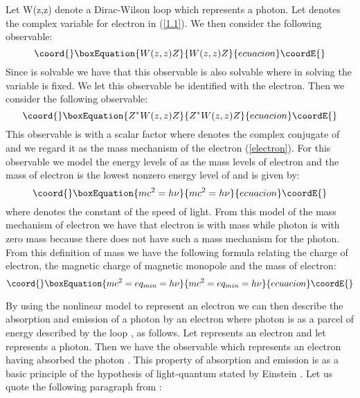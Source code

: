 \documentclass[a4paper,a4paper]{article}
\begin{document}
Let W(z,z) denote a Dirac-Wilson loop which represents a photon. Let
\coordHE{} denotes the complex variable for electron in (\ref{1.1}). We then consider the following observable:
\begin{equation}\coord{}\boxEquation{
 W(z,z)Z
\label{electron}
}{
 W(z,z)Z
}{ecuacion}\coordE{}\end{equation}
Since \coordHE{} is solvable we have that this observable is also solvable where in solving \coordHE{} the variable \coordHE{} is fixed. We let this observable be identified with the electron. Then we consider the following observable:
\begin{equation}\coord{}\boxEquation{
 Z^* W(z,z)Z
\label{electron1}
}{
 Z^* W(z,z)Z
}{ecuacion}\coordE{}\end{equation}
This observable is with a scalar factor \coordHE{} where \coordHE{} denotes the complex conjugate of \coordHE{} and we regard it as the mass mechanism of the electron (\ref{electron}). For this observable we model the energy levels of \coordHE{} as the mass levels of electron and the mass \coordHE{} of electron is the lowest nonzero energy level \coordHE{} of \coordHE{} and is given by:
\begin{equation}\coord{}\boxEquation{
 mc^2=h\nu
\label{electron2}
}{
 mc^2=h\nu
}{ecuacion}\coordE{}\end{equation}
where \coordHE{} denotes the constant of the speed of light. From this model of the mass mechanism of electron we have that electron is with mass \coordHE{} while photon is with zero mass because there does not have such a mass mechanism \coordHE{} for the photon. From this definition of mass we have the following formula relating the charge \coordHE{} of electron, the magnetic charge \coordHE{} of magnetic monopole and the mass \coordHE{} of electron:
\begin{equation}\coord{}\boxEquation{
 mc^2= e q_{min}=h\nu
\label{electron3}
}{
 mc^2= e q_{min}=h\nu
}{ecuacion}\coordE{}\end{equation}

By using the nonlinear model \coordHE{} to represent an electron we can then describe the absorption and emission of a photon by an electron where photon is as a parcel of energy described by the loop \coordHE{}, as follows. Let \coordHE{} represents an electron and let \coordHE{} represents a photon. Then we have the observable \coordHE{} which represents an electron having absorbed the photon \coordHE{}. This property of absorption and emission is as a basic principle of the hypothesis of light-quantum stated by Einstein \cite{Pai}. Let us quote the following paragraph from \cite{Pai}:
\end{document}
